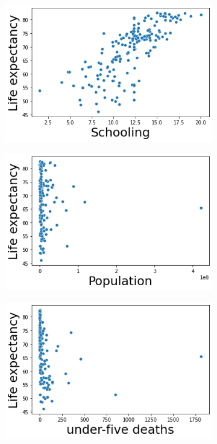 \begin{itemize}
    \begin{figure}[H]
              \centering
              \begin{subfigure}{0.15\linewidth}
                \centering
                \includegraphics[width=\textwidth]{img/34.png}
              \end{subfigure}
              \hfill
                \begin{subfigure}{0.15\linewidth}
                \centering
                \includegraphics[width=\textwidth]{img/35.png}
              \end{subfigure}
                \hfill
                \begin{subfigure}{0.15\linewidth}
                \centering
                \includegraphics[width=\textwidth]{img/36.png}

\end{subfigure}
\end{figure}
\end{itemize}
